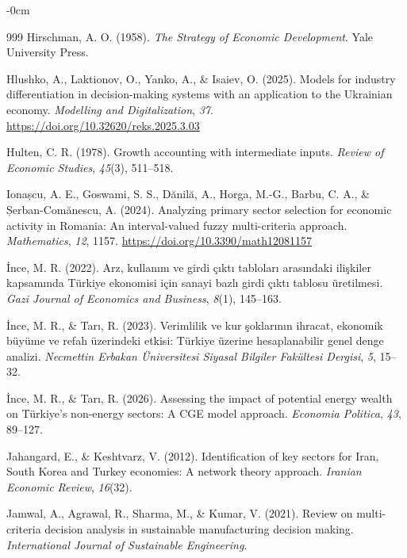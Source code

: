 \documentclass[journal,article,submit,pdftex,moreauthors]{Definitions/mdpi}
\begin{document}
\begin{adjustwidth}{-\extralength}{0cm}
{\begin{thebibliography}{999}
Hirschman, A. O. (1958). \textit{The Strategy of Economic Development}. Yale University Press.

Hlushko, A., Laktionov, O., Yanko, A., \& Isaiev, O. (2025). Models for industry differentiation in decision-making systems with an application to the Ukrainian economy. \textit{Modelling and Digitalization}, \textit{37}. \url{https://doi.org/10.32620/reks.2025.3.03}

Hulten, C. R. (1978). Growth accounting with intermediate inputs. \textit{Review of Economic Studies}, \textit{45}(3), 511--518.

Ionașcu, A. E., Goswami, S. S., Dănilă, A., Horga, M.-G., Barbu, C. A., \& Șerban-Comănescu, A. (2024). Analyzing primary sector selection for economic activity in Romania: An interval-valued fuzzy multi-criteria approach. \textit{Mathematics}, \textit{12}, 1157. \url{https://doi.org/10.3390/math12081157}

İnce, M. R. (2022). Arz, kullanım ve girdi çıktı tabloları arasındaki ilişkiler kapsamında Türkiye ekonomisi için sanayi bazlı girdi çıktı tablosu üretilmesi. \textit{Gazi Journal of Economics and Business}, \textit{8}(1), 145--163.

İnce, M. R., \& Tarı, R. (2023). Verimlilik ve kur şoklarının ihracat, ekonomik büyüme ve refah üzerindeki etkisi: Türkiye üzerine hesaplanabilir genel denge analizi. \textit{Necmettin Erbakan Üniversitesi Siyasal Bilgiler Fakültesi Dergisi}, \textit{5}, 15--32.

İnce, M. R., \& Tarı, R. (2026). Assessing the impact of potential energy wealth on Türkiye's non-energy sectors: A CGE model approach. \textit{Economia Politica}, \textit{43}, 89--127.

Jahangard, E., \& Keshtvarz, V. (2012). Identification of key sectors for Iran, South Korea and Turkey economies: A network theory approach. \textit{Iranian Economic Review}, \textit{16}(32).

Jamwal, A., Agrawal, R., Sharma, M., \& Kumar, V. (2021). Review on multi-criteria decision analysis in sustainable manufacturing decision making. \textit{International Journal of Sustainable Engineering}.


\end{thebibliography}}
\end{adjustwidth}
\end{document}
